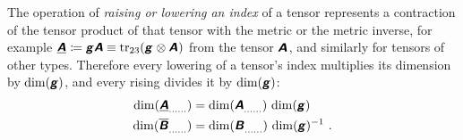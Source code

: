 \documentclass[\ifafour a4paper,12pt,\else a5paper,10pt,\fi%
onecolumn,oneside,article,%
british%
]{memoir}
\makeatletter
\theoremstyle{remark}
\theoremstyle{innote}
\newcommand*{\mathte}[1]{\textbf{\textit{\textsf{#1}}}}
\newcommand*{\delt}{\deltaup}%
\DeclareMathOperator{\tr}{tr}%
\newcommand*{\defd}{\coloneqq}
\DeclarePairedDelimiter\abs{\lvert}{\rvert}
\renewcommand*{\|}[1][]{\nonscript\,#1\vert\nonscript\;\mathopen{}}
\newcommand*{\q}{}%
\DeclareRobustCommand*{\q}{%
  \mathord{\mathpalette\bigcdot@{}}%
}
\newcommand*{\bigcdot@scalefactor}{0.7}
\newcommand*{\bigcdot@widthfactor}{1.5}
\newcommand*{\bigcdot@}[2]{%
  \sbox0{$#1\vcenter{}$}%
  \sbox2{$#1\cdot\m@th$}%
  \hbox to \bigcdot@widthfactor\wd2{%
    \hfil
    \raise\ht0\hbox{%
      \scalebox{\bigcdot@scalefactor}{%
        \lower\ht0\hbox{$#1\bullet\m@th$}%
      }%
    }%
    \hfil
  }%
}
\newcommand*{\yA}{\mathte{A}}
\newcommand*{\yAg}{\underline{\yA}}
\newcommand*{\yB}{\mathte{B}}
\newcommand*{\yBg}{\overline{\yB}}
\newcommand*{\yg}{\mathte{g}}
\renewcommand*{\i}{\indices}
\newcommand*{\ye}{\bm{e}}
\newcommand*{\ygv}{\bm{\gamma}}
\makeatother
\begin{document}
\medskip

The operation of \emph{raising or lowering an index} of a tensor represents
a contraction of the tensor product of that tensor with the metric or the
metric inverse, for example
$\yAg\i{_{\q\q}} \defd \yg\yA \equiv \tr_{23}(\yg\i{_{\q\q}} \otimes
\yA\i{^{\q}_{\q}})$ from the tensor $\yA\i{^{\q}_{\q}}$, and similarly for
tensors of other types. Therefore every lowering of a tensor's index
multiplies its dimension by $\dim(\yg)$, and every rising divides it by
$\dim(\yg)$:
\begin{equation}
  \label{eq:raising_lowering}
  \begin{split}
  \dim(\yAg\i{_{\dotso}_{\q}_{\dotso}}) &=
  \dim(\yA\i{_{\dotso}^{\q}_{\dotso}})\,\dim(\yg)
\\
  \dim(\yBg\i{_{\dotso}^{\q}_{\dotso}}) &=
  \dim(\yB\i{_{\dotso}_{\q}_{\dotso}})\,\dim(\yg)^{-1} \ .
\end{split}
\end{equation}

\medskip


\end{document}
